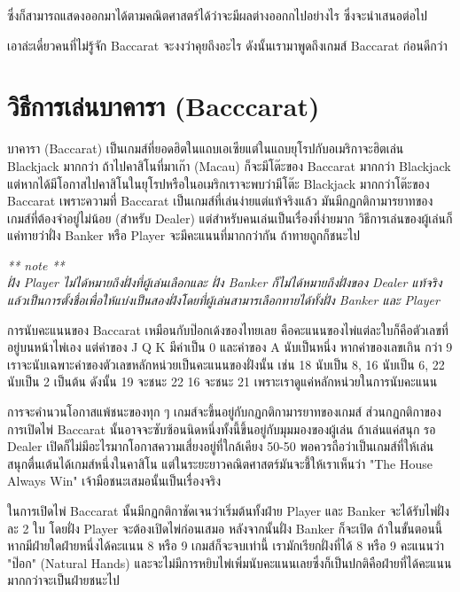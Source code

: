 \documentclass{article}
\begin{document}
ซึ่งก็สามารถแสดงออกมาได้ตามคณิตศาสตร์ได้ว่าจะมีผลต่างออกกไปอย่างไร ซึ่งจะนำเสนอต่อไป

เอาล่ะเดี๋ยวคนที่ไม่รู้จัก Baccarat จะงงว่าคุยถึงอะไร ดังนั้นเรามาพูดถึงเกมส์ Baccarat ก่อนดีกว่า 


\newpage
\section{วิธีการเล่นบาคารา (Bacccarat)}
บาคารา (Baccarat) เป็นเกมส์ที่ยอดฮิตในแถบเอเซียแต่ในแถบยุโรปกับอเมริกาจะฮิตเล่น Blackjack มากกว่า ถ้าไปคาสิโนที่มาเก๊า (Macau) ก็จะมีโต๊ะของ Baccarat มากกว่า Blackjack แต่หากได้มีโอกาสไปคาสิโนในยุโรปหรือในอเมริกเราจะพบว่ามีโต๊ะ Blackjack มากกว่าโต๊ะของ Baccarat เพราะความที่ Baccarat เป็นเกมส์ที่เล่นง่ายแต่แท้จริงแล้ว มันมีกฏกติกามารยาทของเกมส์ที่ต้องจำอยู่ไม่น้อย (สำหรับ Dealer) แต่สำหรับคนเล่นเป็นเรื่องที่ง่ายมาก วิธีการเล่นของผู้เล่นก็แค่ทายว่าฝั่ง Banker หรือ Player จะมีคะแนนที่มากกว่ากัน ถ้าทายถูกก็ชนะไป 
\begin{center}
\emph{** note **}\\
\textit{ฝั่ง Player ไม่ได้หมายถึงฝั่งที่ผู้เล่นเลือกและ ฝั่ง Banker ก็ไม่ได้หมายถึงฝั่งของ Dealer แท้จริงแล้วเป็นการตั้งชื่อเพื่อให้แบ่งเป็นสองฝั่งโดยที่ผู้เล่นสามารเลือกทายได้ทั้งฝั่ง Banker และ Player}
\end{center}

การนับคะแนนของ Baccarat เหมือนกับป๊อกเด้งของไทยเลย คือคะแนนของไพ่แต่ละใบก็คือตัวเลขที่อยู่บนหน้าไพ่เอง แต่ค่าของ J Q K มีค่าเป็น 0 และค่าของ A นับเป็นหนึ่ง หากค่าของเลขเกิน กว่า 9 เราจะนับเฉพาะค่าของตัวเลขหลักหน่วยเป็นคะแนนของฝั่งนั้น เช่น 18 นับเป็น 8, 16 นับเป็น 6, 22 นับเป็น 2 เป็นต้น ดังนั้น 19 จะชนะ 22 16  จะชนะ 21 เพราะเราดูแค่หลักหน่วยในการนับคะแนน 

การจะคำนวนโอกาสแพ้ชนะของทุก ๆ เกมส์จะขึ้นอยู่กับกฏกติกามารยาทของเกมส์ ส่วนกฏกติกาของการเปิดไพ่ Baccarat นั้นอาจจะซับซ้อนนิดหนึ่งทั้งนี้ขึ้นอยู่กับมุมมองของผู้เล่น ถ้าเล่นแค่สนุก รอ Dealer เปิดก็ไม่มีอะไรมากโอกาสความเสี่ยงอยู่ที่ใกล้เคียง 50-50 พอควรถือว่าเป็นเกมส์ที่ให้เล่นสนุกตื่นเต้นได้เกมส์หนึ่งในคาสิโน แต่ในระยะยาวคณิตศาสตร์มันจะชี้ให้เราเห็นว่า "The House Always Win" เจ้ามือชนะเสมอนั้นเป็นเรื่องจริง

ในการเปิดไพ่ Baccarat นั้นมีกฏกติกาชัดเจนว่าเริ่มต้นทั้งฝ่าย Player และ Banker จะได้รับไพ่ฝั่งละ 2 ใบ โดยฝั่ง Player จะต้องเปิดไพ่ก่อนเสมอ หลังจากนั้นฝั่ง Banker ก็จะเปิด ถ้าในขั้นตอนนี้หากมีฝ่ายใดฝ่ายหนึ่งได้คะแนน 8 หรือ 9 เกมส์ก็จะจบเท่านี้ เรามักเรียกฝั่งที่ได้ 8 หรือ 9 คะแนนว่า "ป๊อก" (Natural Hands) และจะไม่มีการหยิบไพ่เพิ่มนับคะแนนเลยซึ่งก็เป็นปกติคือฝ่ายที่ได้คะแนนมากกว่าจะเป็นฝ่ายชนะไป 
\end{document}
